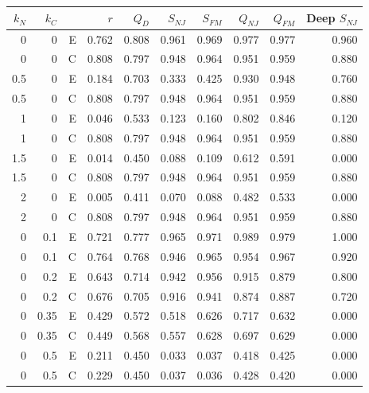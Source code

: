 \begin{tabular}{rrrrrrrrrr}
\toprule
$k_N$ & $k_C$ &  & $r$ & $Q_D$ & $S_{NJ}$ & $S_{FM}$ & $Q_{NJ}$ & $Q_{FM}$ & Deep $S_{NJ}$ \\
\midrule
0 & 0 & E & 0.762 & 0.808 & 0.961 & 0.969 & 0.977 & 0.977 & 0.960 \\
0 & 0 & C & 0.808 & 0.797 & 0.948 & 0.964 & 0.951 & 0.959 & 0.880 \\
0.5 & 0 & E & 0.184 & 0.703 & 0.333 & 0.425 & 0.930 & 0.948 & 0.760 \\
0.5 & 0 & C & 0.808 & 0.797 & 0.948 & 0.964 & 0.951 & 0.959 & 0.880 \\
1 & 0 & E & 0.046 & 0.533 & 0.123 & 0.160 & 0.802 & 0.846 & 0.120 \\
1 & 0 & C & 0.808 & 0.797 & 0.948 & 0.964 & 0.951 & 0.959 & 0.880 \\
1.5 & 0 & E & 0.014 & 0.450 & 0.088 & 0.109 & 0.612 & 0.591 & 0.000 \\
1.5 & 0 & C & 0.808 & 0.797 & 0.948 & 0.964 & 0.951 & 0.959 & 0.880 \\
2 & 0 & E & 0.005 & 0.411 & 0.070 & 0.088 & 0.482 & 0.533 & 0.000 \\
2 & 0 & C & 0.808 & 0.797 & 0.948 & 0.964 & 0.951 & 0.959 & 0.880 \\
0 & 0.1 & E & 0.721 & 0.777 & 0.965 & 0.971 & 0.989 & 0.979 & 1.000 \\
0 & 0.1 & C & 0.764 & 0.768 & 0.946 & 0.965 & 0.954 & 0.967 & 0.920 \\
0 & 0.2 & E & 0.643 & 0.714 & 0.942 & 0.956 & 0.915 & 0.879 & 0.800 \\
0 & 0.2 & C & 0.676 & 0.705 & 0.916 & 0.941 & 0.874 & 0.887 & 0.720 \\
0 & 0.35 & E & 0.429 & 0.572 & 0.518 & 0.626 & 0.717 & 0.632 & 0.000 \\
0 & 0.35 & C & 0.449 & 0.568 & 0.557 & 0.628 & 0.697 & 0.629 & 0.000 \\
0 & 0.5 & E & 0.211 & 0.450 & 0.033 & 0.037 & 0.418 & 0.425 & 0.000 \\
0 & 0.5 & C & 0.229 & 0.450 & 0.037 & 0.036 & 0.428 & 0.420 & 0.000 \\
\bottomrule
\end{tabular}
